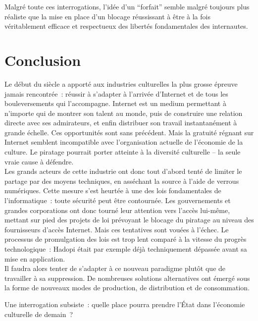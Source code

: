 \documentclass[a4paper]{report}
\begin{document}
	Malgré toute ces interrogations, l'idée d'un ``forfait'' semble malgré toujours plus réaliste que la mise en place d'un blocage réussissant à être à la fois véritablement efficace et respectueux des libertés fondamentales des internautes.





	\chapter{Conclusion}
	Le début du siècle a apporté aux industries culturelles la plus grosse épreuve jamais rencontrée : réussir à s'adapter à l'arrivée d'Internet et de tous les bouleversements qui l'accompagne. Internet est un medium permettant à n'importe qui de montrer son talent au monde, puis de construire une relation directe avec ses admirateurs, et enfin distribuer son travail instantanément à grande échelle. Ces opportunités sont sans précédent. Mais la gratuité régnant sur Internet semblent incompatible avec l'organisation actuelle de l'économie de la culture. Le piratage pourrait porter atteinte à la diversité culturelle – la seule vraie cause à défendre.\\

	Les grands acteurs de cette industrie ont donc tout d'abord tenté de limiter le partage par des moyens techniques, en asséchant la source à l'aide de verrous numériques. Cette mesure s'est heurtée à une des lois fondamentales de l'informatique : toute sécurité peut être contournée. Les gouvernements et grandes corporations ont donc tourné leur attention vers l'accès lui-même, mettant sur pied des projets de loi prévoyant le blocage du piratage au niveau des fournisseurs d'accès Internet. Mais ces tentatives sont vouées à l'échec. Le processus de promulgation des lois est trop lent comparé à la vitesse du progrès technologique : Hadopi était par exemple déjà techniquement dépassée avant sa mise en application.\\

	Il faudra alors tenter de s'adapter à ce nouveau paradigme plutôt que de travailler à sa suppression. De nombreuses solutions alternatives ont émergé sous la forme de nouveaux modes de production, de distribution et de consommation.
	
	Une interrogation subsiste : quelle place pourra prendre l'État dans l'économie culturelle de demain ?




	
	




\end{document}
